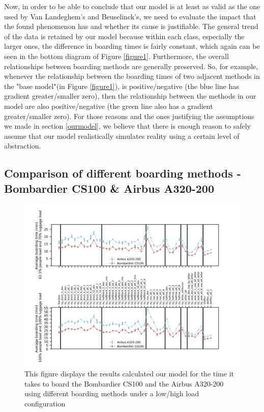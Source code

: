 \documentclass[11pt]{article}
\begin{document}
Now, in order to be able to conclude that our model is at least as valid as the one used by Van Landeghem's and Beuselinck's, we need to evaluate the impact that the found phenomenon has and whether its cause is justifiable. 
The general trend of the data is retained by our model because within each class, especially the larger ones, the difference in boarding times is fairly constant, which again can be seen in the bottom diagram of Figure \ref{figure1}. Furthermore, the overall relationships between boarding methods are generally preserved. So, for example, whenever the relationship between the boarding times of two adjacent methods in the "base model"(in Figure \ref{figure1}), is positive/negative (the blue line has gradient greater/smaller zero), then the relationship between the methods in our model are also positive/negative (the green line also has a gradient greater/smaller zero). For those reasons and the ones justifying the assumptions we made in section \ref{ourmodel}, we believe that there is enough reason to safely assume that our model realistically simulates reality using a certain level of abstraction.  

\subsection{Comparison of different boarding methods - Bombardier CS100 \& Airbus A320-200}
\begin{figure}
	\includegraphics[width=\linewidth]{../../code/AirplaneBoarding/data/figure2/figure2.png}
	\caption{This figure displays the results calculated our model for the time it takes to board the Bombardier CS100 and the Airbus A320-200 using different boarding methods under a low/high load configuration}
	\label{figure2}
\end{figure}
\end{document}
